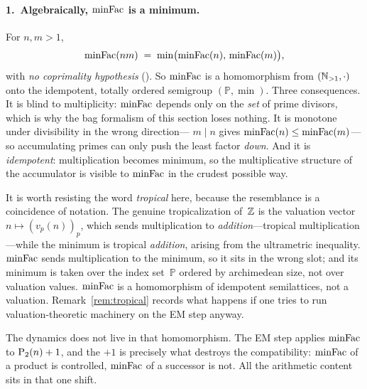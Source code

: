 \paragraph{1.\ Algebraically, $\mathrm{minFac}$ is a minimum.}
For $n, m > 1$,
\[
  \mathrm{minFac}(nm) \;=\; \min\bigl(\mathrm{minFac}(n),\, \mathrm{minFac}(m)\bigr),
\]
with \emph{no coprimality hypothesis}
().  So $\mathrm{minFac}$
is a homomorphism from $(\mathbb{N}_{>1}, \cdot)$ onto the idempotent,
totally ordered semigroup $(\mathbb{P}, \min)$.  Three consequences.
It is blind to multiplicity: $\mathrm{minFac}$ depends only on the \emph{set} of
prime divisors, which is why the bag formalism of this section loses
nothing.  It is monotone under divisibility in the wrong direction---
$m \mid n$ gives $\mathrm{minFac}(n) \leq \mathrm{minFac}(m)$---so accumulating primes
can only push the least factor \emph{down}.  And it is
\emph{idempotent}: multiplication becomes minimum, so the multiplicative
structure of the accumulator is visible to $\mathrm{minFac}$ in the crudest
possible way.

It is worth resisting the word \emph{tropical} here, because the
resemblance is a coincidence of notation.  The genuine tropicalization
of~$\mathbb{Z}$ is the valuation vector $n \mapsto (v_p(n))_p$, which sends
multiplication to \emph{addition}---tropical multiplication---while the
minimum is tropical \emph{addition}, arising from the ultrametric
inequality.  $\mathrm{minFac}$ sends multiplication to the minimum, so it sits
in the wrong slot; and its minimum is taken over the index
set~$\mathbb{P}$ ordered by archimedean size, not over valuation values.
$\mathrm{minFac}$ is a homomorphism of idempotent semilattices, not a valuation.
Remark~\ref{rem:tropical} records what happens if one tries to run
valuation-theoretic machinery on the EM step anyway.

The dynamics does not live in that homomorphism.  The EM step applies
$\mathrm{minFac}$ to $\mathrm{P}_{2}(n) + 1$, and the $+1$ is precisely what destroys
the compatibility: $\mathrm{minFac}$ of a product is controlled, $\mathrm{minFac}$ of a
successor is not.  All the arithmetic content sits in that one shift.

